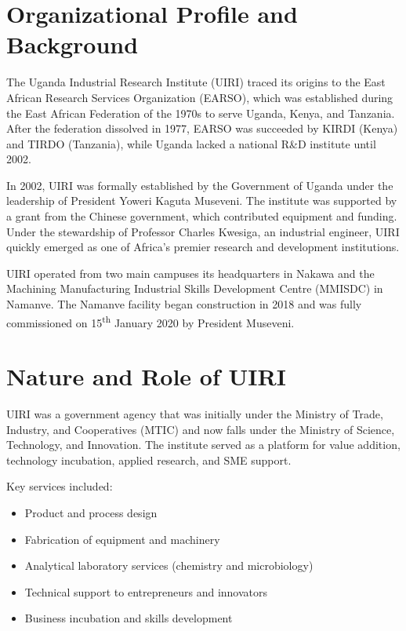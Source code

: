 \documentclass[12pt,a4paper]{report}
\begin{document}
\section{Organizational Profile and Background}
\noindent The Uganda Industrial Research Institute (UIRI) traced its origins to the East African Research Services Organization (EARSO), which was established during the East African Federation of the 1970s to serve Uganda, Kenya, and Tanzania. After the federation dissolved in 1977, EARSO was succeeded by KIRDI (Kenya) and TIRDO (Tanzania), while Uganda lacked a national R\&D institute until 2002.

\noindent In 2002, UIRI was formally established by the Government of Uganda under the leadership of President Yoweri Kaguta Museveni. The institute was supported by a grant from the Chinese government, which contributed equipment and funding. Under the stewardship of Professor Charles Kwesiga, an industrial engineer, UIRI quickly emerged as one of Africa's premier research and development institutions.

\noindent UIRI operated from two main campuses its headquarters in Nakawa and the Machining Manufacturing Industrial Skills Development Centre (MMISDC) in Namanve. The Namanve facility began construction in 2018 and was fully commissioned on 15\textsuperscript{th} January 2020 by President Museveni.

\section{Nature and Role of UIRI}
\noindent UIRI was a government agency that was initially under the Ministry of Trade, Industry, and Cooperatives (MTIC) and now falls under the Ministry of Science, Technology, and Innovation. The institute served as a platform for value addition, technology incubation, applied research, and SME support.

\noindent Key services included:
\begin{itemize}
    \item Product and process design
    \item Fabrication of equipment and machinery
    \item Analytical laboratory services (chemistry and microbiology)
    \item Technical support to entrepreneurs and innovators
    \item Business incubation and skills development
\end{itemize}
\end{document}
